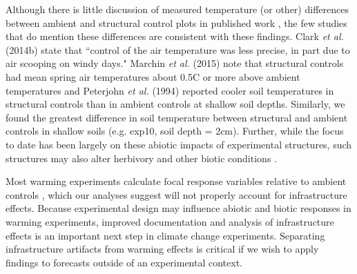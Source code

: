 \documentclass{article}
\begin{document}
\par Although there is little discussion of measured temperature (or other) differences between ambient and structural control plots in published work \citep[e.g.,][]{farnsworth1995,pelini2011,clark2014a}, the few studies that do mention these differences are consistent with these findings. Clark \textit{et al.} (2014b) state that ``control of the air temperature was less precise, in part due to air scooping on windy days." Marchin \textit{et al.} (2015) note that structural controls had mean spring air temperatures about  0.5\degree C or more above ambient temperatures and Peterjohn \textit{et al.} (1994) reported cooler soil temperatures in structural controls than in ambient controls at shallow soil depths. Similarly, we found the greatest difference in soil temperature between structural and ambient controls in shallow soils (e.g. exp10, soil depth = 2cm). Further, while the focus to date has been largely on these abiotic impacts of experimental structures, such structures may also alter herbivory and other biotic conditions \citep{kennedy1995,moise2010,wolkovich2012,hoeppner2012}. 

\par Most warming experiments calculate focal response variables relative to ambient controls \citep [e.g.,][]{marchin2015}, which our analyses suggest will not properly account for infrastructure effects. Because experimental design may influence abiotic and biotic responses in warming experiments, improved documentation and analysis of infrastructure effects is an important next step in climate change experiments. Separating infrastructure artifacts from warming effects is critical if we wish to apply findings to forecasts outside of an experimental context.
\end{document}

